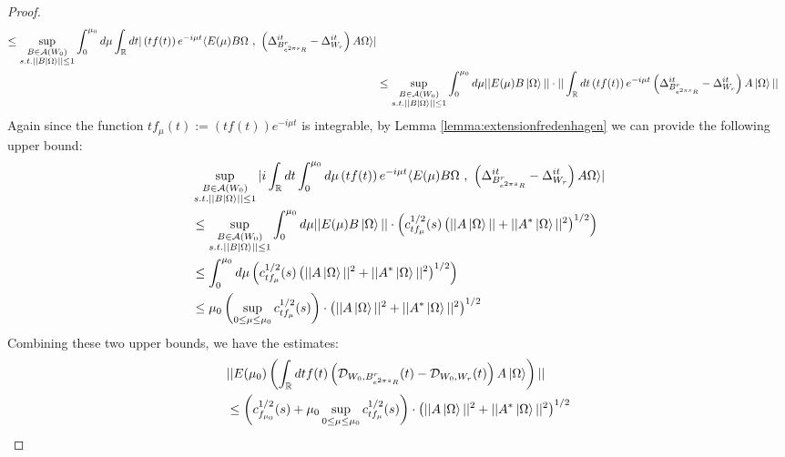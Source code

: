 \documentclass[a4paper,11pt]{article}
\theoremstyle{definition}
\newcommand{\lb}{\left(}
\newcommand{\rb}{\right)}
\begin{document}
\begin{proof}
\begin{align}
\begin{split}
            \leq \sup_{\substack{B\in\mathcal{A}(W_0)\\s.t.||B\ket{\Omega}||\leq 1}}\int_0^{\mu_0}d\mu\int_\mathbb{R} dt |\lb tf(t)\rb e^{-i\mu t}\langle E(\mu)B\Omega\text{ , }\lb \Delta^{it}_{B^r_{e^{2\pi s}R}} - \Delta^{it}_{W_r} \rb A\Omega \rangle|
            \\&
            \leq \sup_{\substack{B\in\mathcal{A}(W_0)\\s.t.||B\ket{\Omega}||\leq 1}}\int_0^{\mu_0}d\mu ||E(\mu) B\ket{\Omega}||\cdot||\int_\mathbb{R} dt\lb tf(t) \rb e^{-i\mu t}\lb\Delta^{it}_{B^r_{e^{2\pi s}R}}- \Delta^{it}_{W_r}\rb A\ket{\Omega}||
        \end{split}
    \end{align}
    Again since the function $tf_\mu(t):= \lb tf(t) \rb e^{-i\mu t}$ is integrable, by Lemma \ref{lemma:extensionfredenhagen} we can provide the following upper bound:
    \begin{align}
        \begin{split}
            &\sup_{\substack{B\in\mathcal{A}(W_0)\\s.t.||B\ket{\Omega}||\leq 1}}|i\int_\mathbb{R} dt \int_0^{\mu_0}d\mu \lb tf(t)\rb e^{-i\mu t}\langle E(\mu)B\Omega\text{ , }\lb\Delta^{it}_{B^r_{e^{2\pi s}R}} - \Delta^{it}_{W_r}\rb A\Omega \rangle|
            \\&
            \leq \sup_{\substack{B\in\mathcal{A}(W_0)\\s.t.||B\ket{\Omega}||\leq 1}}\int_0^{\mu_0}d\mu ||E(\mu)B\ket{\Omega}||\cdot\lb c^{1/2}_{t f_\mu}(s)\lb||A\ket{\Omega}|| + ||A^*\ket{\Omega}||^2\rb^{1/2}\rb
            \\&
            \leq \int_0^{\mu_0}d\mu \lb c^{1/2}_{tf_\mu}(s)\lb||A\ket{\Omega}||^2 + ||A^*\ket{\Omega}||^2\rb^{1/2}\rb 
            \\&
            \leq \mu_0\lb\sup_{0\leq \mu\leq \mu_0}c^{1/2}_{tf_\mu}(s)\rb\cdot\lb||A\ket{\Omega}||^2 + ||A^*\ket{\Omega}||^2\rb^{1/2}
        \end{split}
    \end{align}
    Combining these two upper bounds, we have the estimates:
    \begin{align}
        \begin{split}
            &||E(\mu_0)\lb\int_\mathbb{R} dt f(t)\lb\mathcal{D}_{W_0, B^r_{e^{2\pi s}R}}(t) - \mathcal{D}_{W_0, W_r}(t)\rb A\ket{\Omega}\rb||
            \\&
            \leq \lb c^{1/2}_{f_{\mu_0}}(s) + \mu_0\sup_{0\leq \mu\leq \mu_0}c^{1/2}_{tf_\mu}(s) \rb\cdot\lb||A\ket{\Omega}||^2 + ||A^*\ket{\Omega}||^2\rb^{1/2}

\end{split}
\end{align}
\end{proof}
\end{document}
